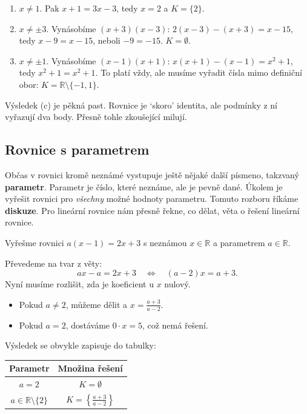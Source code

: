 \begin{solution}
  \begin{enumerate}[label=(\alph*)]
    \item $x\neq 1$. Pak $x + 1 = 3x - 3$, tedy $x = 2$ a $K = \{2\}$.
    \item $x\neq\pm 3$. Vynásobíme $(x + 3)(x - 3)$: $2(x - 3) - (x + 3) = x - 15$, tedy $x - 9 = x - 15$, neboli $-9 = -15$. $K = \emptyset$.
    \item $x\neq\pm 1$. Vynásobíme $(x - 1)(x + 1)$: $x(x + 1) - (x - 1) = x^2 + 1$, tedy $x^2 + 1 = x^2 + 1$. To platí vždy, ale musíme vyřadit čísla mimo definiční obor: $K = \mathbb{R}\setminus\{-1, 1\}$.
  \end{enumerate}
  Výsledek (c) je pěkná past. Rovnice je `skoro' identita, ale podmínky z ní vyřazují dva body. Přesně tohle zkoušející milují.
\end{solution}

\subsection{Rovnice s parametrem}

Občas v rovnici kromě neznámé vystupuje ještě nějaké další písmeno, takzvaný \textbf{parametr}. Parametr je číslo, které neznáme, ale je pevně dané. Úkolem je vyřešit rovnici pro \textit{všechny} možné hodnoty parametru. Tomuto rozboru říkáme \textbf{diskuze}. Pro lineární rovnice nám přesně řekne, co dělat, věta o řešení lineární rovnice.

\begin{example}
  Vyřešme rovnici $a(x - 1) = 2x + 3$ s neznámou $x\in\mathbb{R}$ a parametrem $a\in\mathbb{R}$.

  Převedeme na tvar z věty:
  \begin{equation*}
    ax - a = 2x + 3\quad\Leftrightarrow\quad (a - 2)x = a + 3.
  \end{equation*}
  Nyní musíme rozlišit, zda je koeficient u $x$ nulový.
  \begin{itemize}
    \item Pokud $a\neq 2$, můžeme dělit a $x = \frac{a + 3}{a - 2}$.
    \item Pokud $a = 2$, dostáváme $0\cdot x = 5$, což nemá řešení.
  \end{itemize}
  Výsledek se obvykle zapisuje do tabulky:
  \begin{center}
    \begin{tabular}{|c|c|}
      \hline
      Parametr & Množina řešení \\
      \hline
      $a = 2$ & $K = \emptyset$ \\
      $a\in\mathbb{R}\setminus\{2\}$ & $K = \left\{\frac{a + 3}{a - 2}\right\}$ \\
      \hline
    \end{tabular}
  \end{center}
\end{example}

